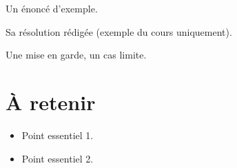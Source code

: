 \documentclass[11pt]{article}
\begin{document}
\begin{exemple}\label{exm:<slug>}
Un énoncé d'exemple.
\end{exemple}

\begin{solution}
Sa résolution rédigée (exemple du cours uniquement).
\end{solution}

\begin{remarque}
Une mise en garde, un cas limite.
\end{remarque}

\begin{center}
\end{center}



\section{À retenir}\label{sec:retenir}

\begin{retenir}
\begin{itemize}
  \item Point essentiel 1.
  \item Point essentiel 2.
\end{itemize}
\end{retenir}

\end{document}

